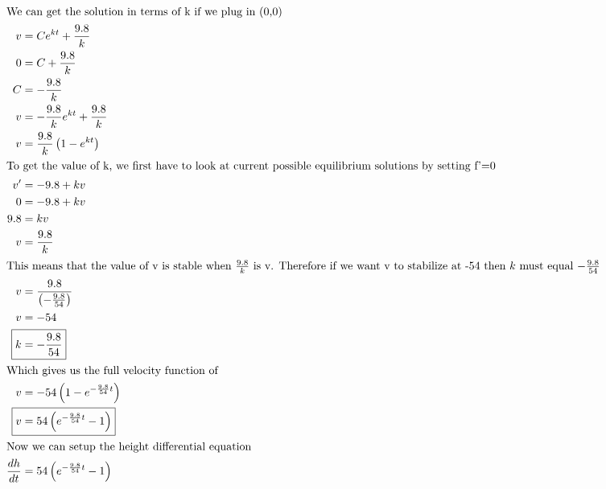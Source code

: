 \documentclass[12pt]{article}
\begin{document}
\begin{align}
  \intertext{We can get the solution in terms of k if we plug in (0,0)}
  v                       & =Ce^{kt}+\frac{9.8}{k}                                                         \\
  0                       & =C+\frac{9.8}{k}                                                               \\
  C                       & =-\frac{9.8}{k}                                                                \\
  v                       & =-\frac{9.8}{k}e^{kt}+\frac{9.8}{k}                                            \\
  v                       & =\frac{9.8}{k}\left(1-e^{kt}\right)                                            \\
  \intertext{To get the value of k, we first have to look at current possible equilibrium solutions by setting f'=0}
  v'                      & =-9.8+kv                                                                       \\
  0                       & =-9.8+kv                                                                       \\
  9.8                     & =kv                                                                            \\
  v                       & =\frac{9.8}{k}                                                                 \\
  \intertext{This means that the value of v is stable when $\frac{9.8}{k}$ is v. Therefore if we want v to stabilize at -54 then $k$ must equal $-\frac{9.8}{54}$}
  v                       & =\frac{9.8}{\left(-\frac{9.8}{54}\right)}                                      \\
  v                       & =-54                                                                           \\
  \Aboxed{k                       & =-\frac{9.8}{54}}                                                               \\
  \intertext{Which gives us the full velocity function of}
  v                       & =-54\left(1-e^{-\frac{9.8}{54}t}\right)                                        \\
  \Aboxed{v                       & =54\left(e^{-\frac{9.8}{54}t}-1\right)}                                         \\
  \intertext{Now we can setup the height differential equation}
  \frac{dh}{dt}           & =54\left(e^{-\frac{9.8}{54}t}-1\right)                                         \\

\end{align}
\end{document}
